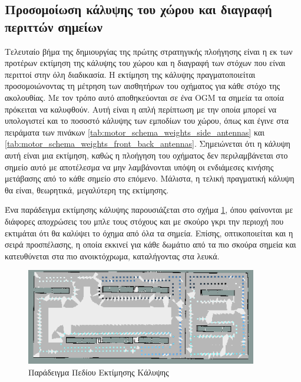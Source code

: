 \subsection{Προσομοίωση κάλυψης του χώρου και διαγραφή περιττών σημείων}
\label{subsection:node_elimination}

Τελευταίο βήμα της δημιουργίας της πρώτης στρατηγικής πλοήγησης είναι η εκ των προτέρων εκτίμηση της κάλυψης του χώρου και η διαγραφή των στόχων που είναι περιττοί στην όλη διαδικασία. Η εκτίμηση της κάλυψης πραγματοποιείται προσομοιώνοντας τη μέτρηση των αισθητήρων του οχήματος για κάθε στόχο της ακολουθίας. Με τον τρόπο αυτό αποθηκεύονται σε ένα OGM τα σημεία τα οποία πρόκειται να καλυφθούν. Αυτή είναι η απλή περίπτωση με την οποία μπορεί να υπολογιστεί και το ποσοστό κάλυψης των εμποδίων του χώρου, όπως και έγινε στα πειράματα των πινάκων  \ref{tab:motor_schema_weights_side_antennas} και \ref{tab:motor_schema_weights_front_back_antennas}. Σημειώνεται ότι η κάλυψη αυτή είναι μια εκτίμηση, καθώς η πλοήγηση του οχήματος δεν περιλαμβάνεται στο σημείο αυτό με αποτέλεσμα να μην λαμβάνονται υπόψη οι ενδιάμεσες κινήσης μετάβασης από το κάθε σημείο στο επόμενο. Μάλιστα, η τελική πραγματική κάλυψη θα είναι, θεωρητικά, μεγαλύτερη της εκτίμησης.

Ένα παράδειγμα εκτίμησης κάλυψης παρουσιάζεται στο σχήμα \ref{fig:coverage_estimation_ogm_example}, όπου φαίνονται με διάφορες αποχρώσεις του μπλε τους στόχους και με σκούρο γκρι την περιοχή που εκτιμάται ότι θα καλύψει το όχημα από όλα τα σημεία. Επίσης, οπτικοποιείται και η σειρά προσπέλασης, η οποία εκκινεί για κάθε δωμάτιο από τα πιο σκούρα σημεία και κατευθύνεται στα πιο ανοικτόχρωμα, καταλήγοντας στα λευκά.

\begin{figure}[!htb]
    \centering
    \includegraphics[width=0.9\textwidth]{./images/chapter5/warehouse_4_wall_follow_a_priori_coverage_085_cover_first_weights_2_1_multi_yaw_060.png}
    \caption{Παράδειγμα Πεδίου Εκτίμησης Κάλυψης}
    \label{fig:coverage_estimation_ogm_example}
\end{figure}

